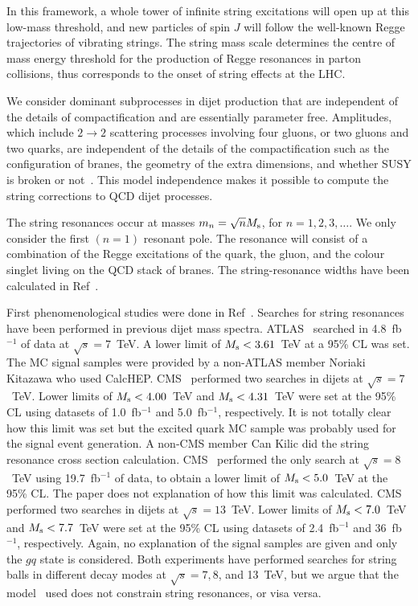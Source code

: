 In this framework, a whole tower of infinite string excitations will
open up at this low-mass threshold, and new particles of spin $J$ will
follow the well-known Regge trajectories of vibrating
strings.  
The string mass scale determines the centre of mass energy threshold 
for the production of Regge resonances in parton collisions, thus
corresponds to the onset of string effects at the LHC.

We consider dominant subprocesses in dijet production that are
independent of the details of compactification and are essentially
parameter free. 
Amplitudes, which include $2\to 2$ scattering processes involving four
gluons, or two gluons and two quarks, are independent of the details of
the compactification such as the configuration of branes, the geometry
of the extra dimensions, and whether SUSY is broken or
not~\cite{Lust:2008qc}. 
This model independence makes it possible to compute the string
corrections to QCD dijet processes.

The string resonances occur at masses $m_n = \sqrt{n} M_\mathrm{s}$, for $n = 1,
2, 3, \ldots$.
We only consider the first $(n=1)$ resonant pole.
The resonance will consist of a combination of the Regge excitations of
the quark, the gluon, and the colour singlet living on the QCD stack of
branes. 
The string-resonance widths have been calculated in
Ref~\cite{Anchordoqui:2008hi}. 

First phenomenological studies were done in
Ref~\cite{Anchordoqui:2007da,Anchordoqui:2009mm,Kitazawa:2010gh,Anchordoqui:2014wha}. 
Searches for string resonances have been performed in previous dijet
mass spectra.
ATLAS~\cite{ATLAS:2012pu} searched in 4.8~fb$^{-1}$ of data at $\sqrt{s}
= 7$~TeV.
A lower limit of $M_\mathrm{s} < 3.61$~TeV at a 95\% CL was set.
The MC signal samples were provided by a non-ATLAS member Noriaki
Kitazawa who used CalcHEP.
CMS~\cite{Chatrchyan:2011ns,CMS:2012yf} performed two searches in dijets
at $\sqrt{s} = 7$~TeV.
Lower limits of $M_\mathrm{s} < 4.00$~TeV and $M_\mathrm{s} < 4.31$~TeV were set at the
95\% CL using datasets of 1.0~fb$^{-1}$ and 5.0~fb$^{-1}$, respectively. 
It is not totally clear how this limit was set but the excited
quark MC sample was probably used for the signal event generation. 
A non-CMS member Can Kilic did the string resonance cross section
calculation. 
CMS~\cite{Khachatryan:2015sja} performed the only search at $\sqrt{s} =
8$~TeV using 19.7~fb$^{-1}$ of data, to obtain a lower limit of $M_\mathrm{s} <
5.0$~TeV at the 95\% CL.
The paper does not explanation of how this limit was calculated.
CMS~\cite{Khachatryan:2015dcf,Sirunyan:2018xlo} performed two searches
in dijets at $\sqrt{s} = 13$~TeV. 
Lower limits of $M_\mathrm{s} < 7.0$~TeV and $M_\mathrm{s} < 7.7$~TeV were set at the
95\% CL using datasets of 2.4~fb$^{-1}$ and 36~fb$^{-1}$, respectively. 
Again, no explanation of the signal samples are given and only the $gq$
state is considered.
Both experiments have performed searches for string balls in different
decay modes at $\sqrt{s} = 7, 8$, and 13~TeV, but we argue that the
model~\cite{Gingrich:2008di} used does not constrain string resonances,
or visa versa. 

